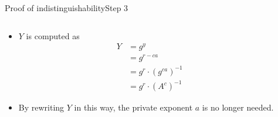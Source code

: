 \documentclass[aspectratio=169, lualatex, handout]{beamer}
\begin{document}
\begin{frame}{Proof of indistinguishability}{Step 3}
	\begin{columns}[c]
		\begin{column}{0.5\textwidth}
			\begin{itemize}[<+->]
				\item $Y$ is computed as
				      \begin{align*}
					      Y & = g^y                       \\
					        & = g^{r-ca}                  \\
					        & = g^{r} \cdot (g^{ca})^{-1} \\
					        & = g^{r} \cdot (A^{c})^{-1}
				      \end{align*}
				\item By rewriting $Y$ in this way, the private exponent $a$ is no longer needed.
			\end{itemize}
		\end{column}
		\begin{column}{0.5\textwidth}
			\begin{center}
			\end{center}
		\end{column}
	\end{columns}
\end{frame}
\end{document}
